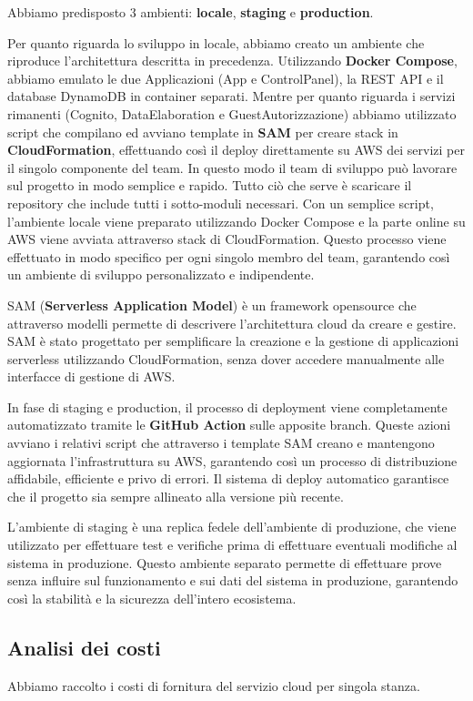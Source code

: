 Abbiamo predisposto 3 ambienti: \textbf{locale}, \textbf{staging} e \textbf{production}.

Per quanto riguarda lo sviluppo in locale, abbiamo creato un ambiente che riproduce l'architettura descritta in precedenza. 
Utilizzando \textbf{Docker Compose}, abbiamo emulato le due Applicazioni (App e ControlPanel), la REST API e il database DynamoDB in container separati. Mentre per quanto riguarda i servizi rimanenti (Cognito, DataElaboration e GuestAutorizzazione) abbiamo utilizzato script che compilano ed avviano template in \textbf{SAM} per creare stack in \textbf{CloudFormation}, effettuando così il deploy direttamente su AWS dei servizi per il singolo componente del team. 
In questo modo il team di sviluppo può lavorare sul progetto in modo semplice e rapido. Tutto ciò che serve è scaricare il repository che include tutti i sotto-moduli necessari. Con un semplice script, l'ambiente locale viene preparato utilizzando Docker Compose e la parte online su AWS viene avviata attraverso stack di CloudFormation. Questo processo viene effettuato in modo specifico per ogni singolo membro del team, garantendo così un ambiente di sviluppo personalizzato e indipendente.

SAM (\textbf{Serverless Application Model}) è un framework opensource che attraverso modelli permette di descrivere l'architettura cloud da creare e gestire. SAM è stato progettato per semplificare la creazione e la gestione di applicazioni serverless utilizzando CloudFormation, senza dover accedere manualmente alle interfacce di gestione di AWS.

In fase di staging e production, il processo di deployment viene completamente automatizzato tramite le \textbf{GitHub Action} sulle apposite branch. Queste azioni avviano i relativi script che attraverso i template SAM creano e mantengono aggiornata l'infrastruttura su AWS, garantendo così un processo di distribuzione affidabile, efficiente e privo di errori. Il sistema di deploy automatico garantisce che il progetto sia sempre allineato alla versione più recente.

L'ambiente di staging è una replica fedele dell'ambiente di produzione, che viene utilizzato per effettuare test e verifiche prima di effettuare eventuali modifiche al sistema in produzione. Questo ambiente separato permette di effettuare prove senza influire sul funzionamento e sui dati del sistema in produzione, garantendo così la stabilità e la sicurezza dell'intero ecosistema.

\subsection{Analisi dei costi}

Abbiamo raccolto i costi di fornitura del servizio cloud per singola stanza.

\newpage